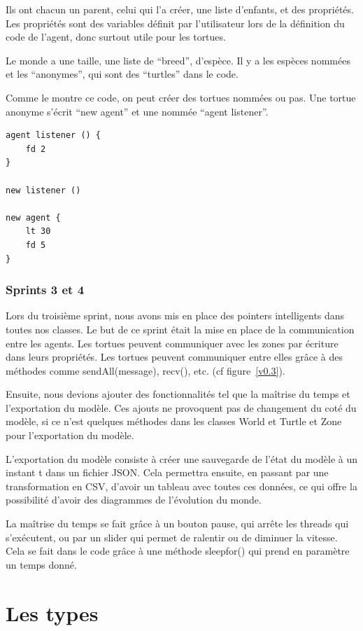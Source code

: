 Ils ont chacun un parent, celui qui l'a créer, une liste d'enfants, et des propriétés. Les propriétés sont des variables définit par l'utilisateur lors de la définition du code de l'agent, donc surtout utile pour les tortues.

Le monde a une taille, une liste de \enquote{breed}, d'espèce. Il y a les espèces nommées et les \enquote{anonymes}, qui sont des \enquote{turtles} dans le code.

Comme le montre ce code, on peut créer des tortues nommées ou pas. Une tortue anonyme s'écrit \enquote{new agent} et une nommée \enquote{agent listener}.

\begin{lstlisting}[language=Stibbons]
agent listener () {
	fd 2
}

new listener ()

new agent {
	lt 30
	fd 5
}
\end{lstlisting}
\subsubsection{Sprints 3 et 4}
Lors du troisième sprint, nous avons mis en place des pointers intelligents dans toutes nos classes. Le but de ce sprint était la mise en place de la communication entre les agents. Les tortues peuvent communiquer avec les zones par écriture dans leurs propriétés. Les tortues peuvent communiquer entre elles grâce à des méthodes comme sendAll(message), recv(), etc.
(cf figure~\ref{v0.3}).

Ensuite, nous devions ajouter des fonctionnalités tel que la maîtrise du temps et l'exportation du modèle. Ces ajouts ne provoquent pas de changement du coté du modèle, si ce n'est quelques méthodes dans les classes World et Turtle et Zone pour l'exportation du modèle.

L'exportation du modèle consiste à créer une sauvegarde de l'état du modèle à un instant t dans un fichier JSON.
Cela permettra ensuite, en passant par une transformation en CSV, d'avoir un tableau avec toutes ces données, ce qui offre la possibilité d'avoir des diagrammes de l'évolution du monde.

La maîtrise du temps se fait grâce à un bouton pause, qui arrête les threads qui s'exécutent, ou par un slider qui permet de ralentir ou de diminuer la vitesse. Cela se fait dans le code grâce à une méthode sleepfor() qui prend en paramètre un temps donné.

\section{Les types}
